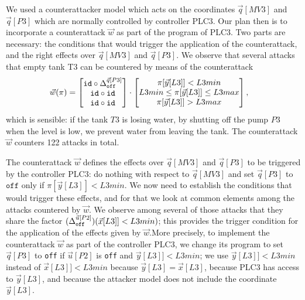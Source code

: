 {We used a counterattacker model which acts on the coordinates $\vec{q}[MV3]$ and $\vec{q}[P3]$ which are normally controlled by controller PLC3. Our plan then is to incorporate a counterattack $\vec{w}$ as part of the program of PLC3. Two parts are necessary: the conditions that would trigger the application of the counterattack, and the right effects over $\vec{q}[MV3]$ and $\vec{q}[P3]$. We observe that several attacks that empty tank T3 can be countered by means of the counterattack 
\begin{align*}
    \vec{w}(\pi)&=
    \begin{bmatrix}
    {\texttt{id}}\circ {\Delta}^{\vec{q}[P3]}_{\texttt{off}} \\
     {\texttt{id}}\circ {\texttt{id}} \\
     {\texttt{id}}\circ {\texttt{id}} \\
    \end{bmatrix}
    \cdot
    \begin{bmatrix}
      \pi[\vec{y}[L3]]<L3min \\
      L3min \leq \pi[\vec{y}[L3]]\leq L3max \\
      \pi[\vec{y}[L3]]>L3max
    \end{bmatrix},
  \end{align*} 
which is sensible: if the tank $T3$ is losing water, by shutting off the pump $P3$ when the level is low, we prevent water from leaving the tank. The counterattack $\vec{w}$ counters 122 attacks in total.

The counterattack $\vec{w}$ defines the effects over $\vec{q}[MV3]$ and $\vec{q}[P3]$ to be triggered by the controller PLC3: do nothing with respect to $\vec{q}[MV3]$ and set $\vec{q}[P3]$ to $\texttt{off}$ only if $\pi[\vec{y}[L3]]<L3min$. We now need to establish the conditions that would trigger these effects, and for that we look at common elements among the attacks countered by $\vec{w}$. We observe among several of those attacks that they share the factor $({\Delta}^{\vec{u}[P2]}_{\texttt{off}})(\vec{x}[L3]]<L3min)$; this provides the trigger condition for the application of the effects given by $\vec{w}$.More precisely, to implement the counterattack $\vec{w}$ as part of the controller PLC3, we change its program to set $\vec{q}[P3]$ to \texttt{off} if $\vec{u}[P2]$ is \texttt{off} and $\vec{y}[L3]]<L3min$; we use $\vec{y}[L3]]<L3min$ instead of $\vec{x}[L3]]<L3min$ because $\vec{y}[L3]=\vec{x}[L3]$, because PLC3 has access to $\vec{y}[L3]$, and because the attacker model does not include the coordinate $\vec{y}[L3]$. 

}
